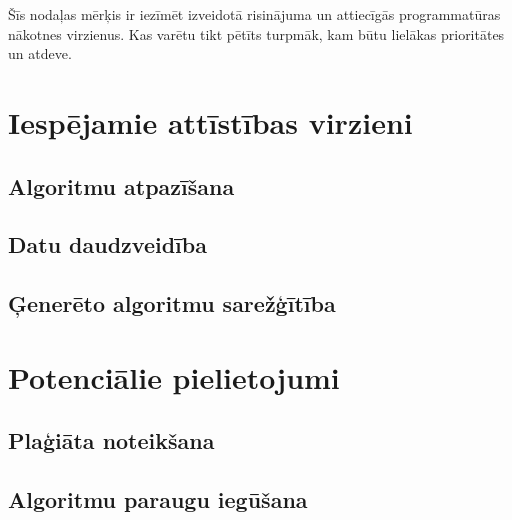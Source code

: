 Šīs nodaļas mērķis ir iezīmēt izveidotā risinājuma un attiecīgās programmatūras nākotnes virzienus. Kas varētu tikt pētīts turpmāk, kam būtu lielākas prioritātes un atdeve.
\section{Iespējamie attīstības virzieni}
\subsection{Algoritmu atpazīšana}
\subsection{Datu daudzveidība}
\subsection{Ģenerēto algoritmu sarežģītība}
\section{Potenciālie pielietojumi}
\subsection{Plaģiāta noteikšana}
\subsection{Algoritmu paraugu iegūšana}
